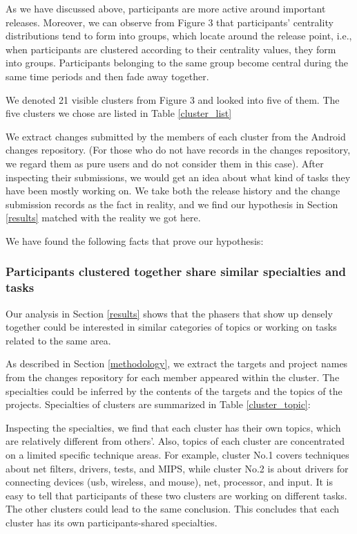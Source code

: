 \documentclass[10pt, conference, compsocconf]{IEEEtran}
\begin{document}
As we have discussed above, participants are more active around
important releases. Moreover, we can observe from Figure 3 that
participants' centrality distributions tend to form into groups, which
locate around the release point, i.e., when participants are clustered
according to their centrality values, they form into
groups. Participants belonging to the same group become central during
the same time periods and then fade away together.


We denoted 21 visible clusters from Figure 3 and looked into five of them. 
The five clusters we chose are listed in Table \ref{cluster_list}


We extract changes submitted by the members of each cluster from the Android changes repository. (For those who do not have records in the changes repository, we regard them as pure users and do not consider them in this case). After inspecting their submissions, we would get an idea about what kind of tasks they have been mostly working on.
We take both the release history and the change submission records as
the fact in reality, and we find our hypothesis in Section
\ref{results} matched with the reality we got here. 


We have found the following facts that prove our hypothesis:


\subsubsection{Participants clustered together share similar specialties and tasks}

Our analysis in Section \ref{results} shows that the phasers that show
up densely together could be interested in similar categories of
topics or working on tasks related to the same area.


As described in Section \ref{methodology}, we extract the targets and
project names from the changes repository for each member appeared
within the cluster. The specialties could be inferred by the contents
of the targets and the topics of the projects. Specialties of clusters
are summarized in Table \ref{cluster_topic}:



Inspecting the specialties, we find that each cluster has their own
topics, which are relatively different from others'. Also, topics of
each cluster are concentrated on a limited specific technique
areas. For example, cluster No.1 covers techniques about net filters,
drivers, tests, and MIPS, while cluster No.2 is about drivers for
connecting devices (usb, wireless, and mouse), net, processor, and
input. It is easy to tell that participants of these two clusters are
working on different tasks. The other clusters could lead to the same
conclusion. This concludes that each cluster has its own
participants-shared specialties.
\end{document}
